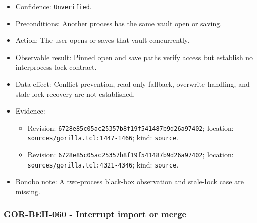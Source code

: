\documentclass[
  letterpaper,
]{article}
\newcommand{\passthrough}[1]{#1}
\providecommand{\tightlist}{%
  \setlength{\itemsep}{0pt}\setlength{\parskip}{0pt}}
\begin{document}
\begin{itemize}
\tightlist
\item
  Confidence: \nolinkurl{Unverified}.
\item
  Preconditions: Another process has the same vault open or saving.
\item
  Action: The user opens or saves that vault concurrently.
\item
  Observable result: Pinned open and save paths verify access but establish no interprocess lock contract.
\item
  Data effect: Conflict prevention, read-only fallback, overwrite handling, and stale-lock recovery are not established.
\item
  Evidence:

  \begin{itemize}
  \tightlist
  \item
    Revision: \nolinkurl{6728e85c05ac25357b8f19f541487b9d26a97402}; location: \nolinkurl{sources/gorilla.tcl:1447-1466};
    kind: \passthrough{\lstinline!source!}.
  \item
    Revision: \nolinkurl{6728e85c05ac25357b8f19f541487b9d26a97402}; location: \nolinkurl{sources/gorilla.tcl:4321-4346};
    kind: \passthrough{\lstinline!source!}.
  \end{itemize}
\item
  Bonobo note: A two-process black-box observation and stale-lock case are missing.
\end{itemize}

\subsubsection{GOR-BEH-060 - Interrupt import or merge}\label{gor-beh-060---interrupt-import-or-merge}
\end{document}
